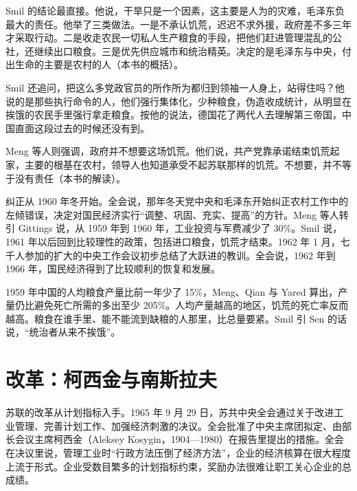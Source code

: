 Smil 的结论最直接。他说，干旱只是一个因素，这主要是人为的灾难，毛泽东负最大的责任\cite{smil1999}。他举了三类做法。一是不承认饥荒，迟迟不求外援，政府差不多三年才采取行动。二是收走农民一切私人生产粮食的手段，把他们赶进管理混乱的公社，还继续出口粮食。三是优先供应城市和统治精英\cite{smil1999}。决定的是毛泽东与中央，付出生命的主要是农村的人（本书的概括）。

Smil 还追问，把这么多党政官员的所作所为都归到领袖一人身上，站得住吗\cite{smil1999}？他说的是那些执行命令的人，他们强行集体化，少种粮食，伪造收成统计，从明显在挨饿的农民手里强行拿走粮食\cite{smil1999}。按他的说法，德国花了两代人去理解第三帝国，中国直面这段过去的时候还没有到\cite{smil1999}。

Meng 等人则强调，政府并不想要这场饥荒\cite{mqy2010}。他们说，共产党靠承诺结束饥荒起家，主要的根基在农村，领导人也知道承受不起苏联那样的饥荒\cite{mqy2010}。不想要，并不等于没有责任（本书的解读）。

纠正从 1960 年冬开始。全会说，那年冬天党中央和毛泽东开始纠正农村工作中的左倾错误，决定对国民经济实行“调整、巩固、充实、提高”的方针\cite{res1981}。Meng 等人转引 Gittings 说，从 1959 年到 1960 年，工业投资与军费减少了 30\%\cite{mqy2010}。Smil 说，1961 年以后回到比较理性的政策，包括进口粮食，饥荒才结束\cite{smil1999}。1962 年 1 月，七千人参加的扩大的中央工作会议初步总结了大跃进的教训\cite{res1981}。全会说，1962 年到 1966 年，国民经济得到了比较顺利的恢复和发展\cite{res1981}。

\begin{pitfall}
1959 年中国的人均粮食产量比前一年少了 15\%，Meng、Qian 与 Yared 算出，产量仍比避免死亡所需的多出至少 205\%\cite{mqy2010}。人均产量越高的地区，饥荒的死亡率反而越高\cite{mqy2010}。粮食在谁手里、能不能流到缺粮的人那里，比总量要紧。Smil 引 Sen 的话说，“统治者从来不挨饿”\cite{smil1999}。
\end{pitfall}

\section{改革：柯西金与南斯拉夫}\label{sec:planned-reform}

苏联的改革从计划指标入手。1965 年 9 月 29 日，苏共中央全会通过关于改进工业管理、完善计划工作、加强经济刺激的决议\cite{zv1965}。全会批准了中央主席团拟定、由部长会议主席柯西金（Aleksey Kosygin，1904—1980）在报告里提出的措施\cite{zv1965,loc43}。全会在决议里说，管理工业时“行政方法压倒了经济方法”，企业的经济核算在很大程度上流于形式\cite{zv1965}。企业受数目繁多的计划指标约束，奖励办法很难让职工关心企业的总成绩\cite{zv1965}。

